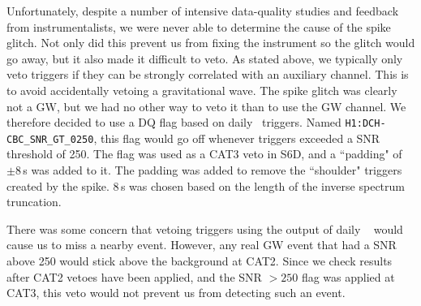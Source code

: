Unfortunately, despite a number of intensive data-quality studies and feedback
from instrumentalists, we were never able to determine the cause of the spike
glitch. Not only did this prevent us from fixing the instrument so the glitch
would go away, but it also made it difficult to veto. As stated above, we
typically only veto triggers if they can be strongly correlated with an
auxiliary channel. This is to avoid accidentally vetoing a gravitational wave.
The spike glitch was clearly not a \ac{GW}, but we had no other way to veto it
than to use the \ac{GW} channel. We therefore decided to use a DQ flag based on
daily \ihope~triggers. Named \verb|H1:DCH-CBC_SNR_GT_0250|, this flag would go
off whenever triggers exceeded a \ac{SNR} threshold of 250. The flag was used
as a CAT3 veto in S6D, and a ``padding" of $\pm8\,$s was added to it. The
padding was added to remove the ``shoulder" triggers created by the spike.
$8\,$s was chosen based on the length of the inverse spectrum truncation.

There was some concern that vetoing triggers using the output of daily \ihope~
would cause us to miss a nearby event. However, any real GW event that had
a SNR above 250 would stick above the background at CAT2. Since we check
results after CAT2 vetoes have been applied, and the SNR $> 250$ flag was
applied at CAT3, this veto would not prevent us from detecting such an event.

